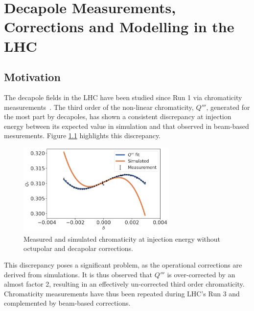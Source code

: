 \chapter{Decapole Measurements, Corrections and Modelling in the LHC}
\thumbforchapter{}
\chaptertoc{}
\newpage

\section{Motivation}

The decapole fields in the LHC have been studied since Run 1 via chromaticity 
measurements~\cite{maclean_non-linear_2011,maclean_commissioning_2016,maclean_measurement_2014}. 
The third order of the non-linear chromaticity, $Q'''$, generated for the most part by decapoles,
has shown a consistent discrepancy at injection energy between its expected value in simulation and
that observed in beam-based mesurements.
Figure \ref{fig:decapoles:bare_chroma_vs_simulations} highlights this discrepancy.

\begin{figure}[H]
    \centering
    \captionsetup{justification=centering,margin=2cm}
    \includegraphics[width=0.7\textwidth]{images/bare_chroma_simulated.png}
    \caption{Measured and simulated chromaticity at injection energy without octupolar and
             decapolar corrections.}
    \label{fig:decapoles:bare_chroma_vs_simulations}
\end{figure}

This discrepancy poses a significant problem, as the operational corrections are derived from
simulations. It is thus observed that $Q'''$ is over-corrected by an almost factor 2, resulting in
an effectively un-corrected third order chromaticity.
Chromaticity measurements have thus been repeated during LHC's Run 3 and complemented by beam-based
corrections.

